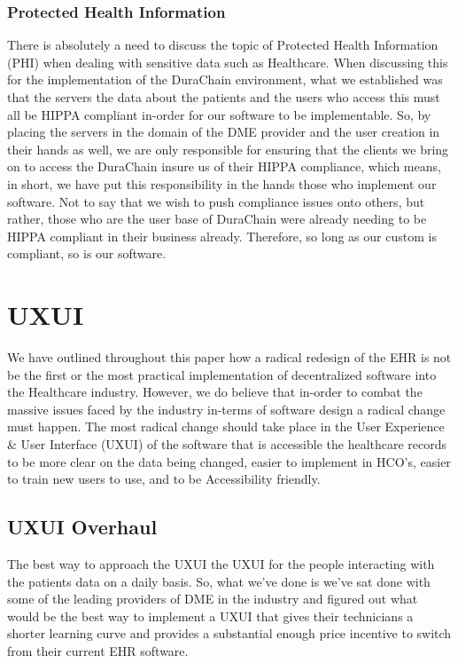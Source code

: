 \documentclass[12pt]{article}
\begin{document}
  \subsubsection{Protected Health Information}
  There is absolutely a need to discuss the topic of Protected Health Information (PHI) when dealing with sensitive data such as Healthcare. When discussing this for the implementation of the DuraChain environment, what we established was that the servers the data about the patients and the users who access this must all be HIPPA compliant in-order for our software to be implementable. So, by placing the servers in the domain of the DME provider and the user creation in their hands as well, we are only responsible for ensuring that the clients we bring on to access the DuraChain insure us of their HIPPA compliance, which means, in short, we have put this responsibility in the hands those who implement our software. Not to say that we wish to push compliance issues onto others, but rather, those who are the user base of DuraChain were already needing to be HIPPA compliant in their business already. Therefore, so long as our custom is compliant, so is our software.

\section{UXUI}
We have outlined throughout this paper how a radical redesign of the EHR is not be the first or the most practical implementation of decentralized software into the Healthcare industry. However, we do believe that in-order to combat the massive issues faced by the industry in-terms of software design a radical change must happen. The most radical change should take place in the User Experience & User Interface (UXUI) of the software that is accessible the healthcare records to be more clear on the data being changed, easier to implement in HCO’s, easier to train new users to use, and to be Accessibility friendly.

  \subsection{UXUI Overhaul}
  The best way to approach the UXUI  the UXUI for the people interacting with the patients data on a daily basis. So, what we’ve done is we’ve sat done with some of the leading providers of DME in the industry and figured out what would be the best way to implement a UXUI that gives their technicians a shorter learning curve and provides a substantial enough price incentive to switch from their current EHR software.
\end{document}
